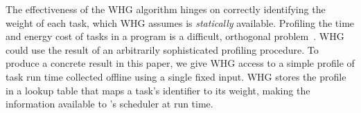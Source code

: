 The effectiveness of the WHG algorithm hinges on correctly identifying the
weight of each task, which WHG assumes is {\em statically} available.
%
Profiling the time and energy cost of tasks in a program is a difficult,
orthogonal problem~\cite{cleancut_2018,baghsorkhi_cgo_2018}.
%
WHG could use the result of an arbitrarily sophisticated profiling procedure.
%
To produce a concrete result in this paper, we give WHG access to a simple
profile of task run time collected offline using a single fixed input.
%
WHG stores the profile in a lookup table that maps a task's identifier to its
weight, making the information available to \sys's scheduler at run time.

